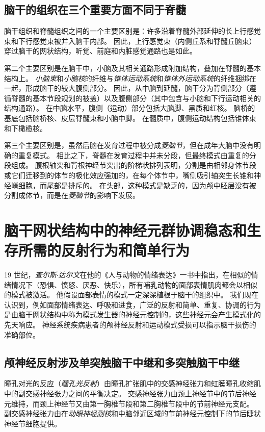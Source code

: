 \subsection{脑干的组织在三个重要方面不同于脊髓}

脑干组织和脊髓组织之间的一个主要区别是：许多沿着脊髓外部延伸的长上行感觉束和下行感觉束被并入脑干内部。
因此，上行感觉束（内侧丘系和脊髓丘脑束）穿过脑干的网状结构，听觉、前庭和内脏感觉通路也是如此。


第二个主要区别是在脑干中，小脑及其相关通路形成附加结构，叠加在脊髓的基本结构上。
\textit{小脑束}和\textit{小脑核}的纤维与\textit{锥体运动系统}和\textit{锥体外运动系统}的纤维捆绑在一起，形成脑干的较大腹侧部分。
因此，从中脑到延髓，脑干分为背侧部分（遵循脊髓的基本节段规划的被盖）以及腹侧部分（其中包含与小脑和下行运动相关的结构通路）。
在中脑水平，腹侧（运动）部分包括大脑脚、黑质和红核。
脑桥的基底包括脑桥核、皮层脊髓束和小脑中脚。
在髓质中，腹侧运动结构包括锥体束和下橄榄核。


第三个主要区别是，虽然后脑在发育过程中被分成\textit{菱脑节}，但在成年大脑中没有明确的重复模式。
相比之下，脊髓在发育过程中并未分段，但最终模式由重复的分段组成。
腹根轴突和背根神经节突出的阶梯状排列表明，分割是由相邻身体节段或它们迁移到的体节的极化效应强加的，在每个体节中，嘴侧吸引轴突生长锥和神经嵴细胞，而尾部是排斥的。
在头部，这种模式是缺乏的，因为颅中胚层没有被分割成体节，而是在\textit{菱脑节}的影响下发展。



\section{脑干网状结构中的神经元群协调稳态和生存所需的反射行为和简单行为}

19 世纪，\textit{查尔斯$\cdot$达尔文}在他的《人与动物的情绪表达》一书中指出，在相似的情绪情况下（恐惧、愤怒、厌恶、快乐），所有哺乳动物的面部表情肌肉都会以相似的模式被激活。
他假设面部表情的模式一定深深植根于脑干的组织中。
我们现在认识到，例如面部情绪表达、呼吸和进食，广泛的反射和简单、重复、协调的行为是由脑干网状结构中称为模式发生器的神经元控制的，这些神经元会产生模式化的先天响应。
神经系统疾病患者的颅神经反射和运动模式受损可以指示脑干损伤的准确部位。



\subsection{颅神经反射涉及单突触脑干中继和多突触脑干中继}

瞳孔对光的反应（\textit{瞳孔光反射}）由瞳孔扩张肌中的交感神经张力和虹膜瞳孔收缩肌中的副交感神经张力之间的平衡决定。
交感神经张力由颈上神经节中的节后神经元维持，而颈上神经节又由第一胸椎节段和第二胸椎节段中的节前神经元支配。
副交感神经张力由在\textit{动眼神经副核}和中脑邻近区域的节前神经元控制下的节后睫状神经节细胞提供。


